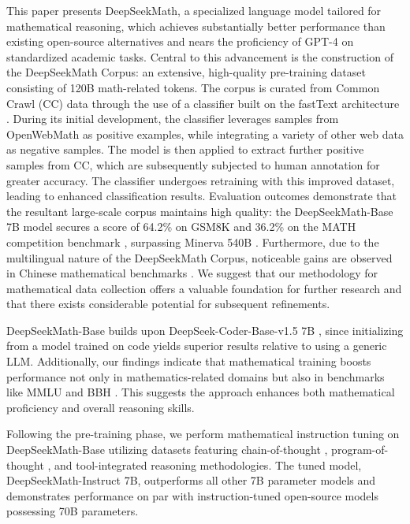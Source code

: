 This paper presents DeepSeekMath, a specialized language model tailored for mathematical reasoning, which achieves substantially better performance than existing open-source alternatives and nears the proficiency of GPT-4 on standardized academic tasks. Central to this advancement is the construction of the DeepSeekMath Corpus: an extensive, high-quality pre-training dataset consisting of 120B math-related tokens. The corpus is curated from Common Crawl (CC) data through the use of a classifier built on the fastText architecture \citep{joulin2016fasttext}. During its initial development, the classifier leverages samples from OpenWebMath \citep{openwebmath} as positive examples, while integrating a variety of other web data as negative samples. The model is then applied to extract further positive samples from CC, which are subsequently subjected to human annotation for greater accuracy. The classifier undergoes retraining with this improved dataset, leading to enhanced classification results. Evaluation outcomes demonstrate that the resultant large-scale corpus maintains high quality: the DeepSeekMath-Base 7B model secures a score of 64.2\% on GSM8K \citep{gsm8k} and 36.2\% on the MATH competition benchmark \citep{MATH}, surpassing Minerva 540B \citep{minerva}. Furthermore, due to the multilingual nature of the DeepSeekMath Corpus, noticeable gains are observed in Chinese mathematical benchmarks \citep{wei2023cmath,agieval}. We suggest that our methodology for mathematical data collection offers a valuable foundation for further research and that there exists considerable potential for subsequent refinements.

DeepSeekMath-Base builds upon DeepSeek-Coder-Base-v1.5 7B \citep{deepseek-coder}, since initializing from a model trained on code yields superior results relative to using a generic LLM. Additionally, our findings indicate that mathematical training boosts performance not only in mathematics-related domains but also in benchmarks like MMLU \citep{mmlu} and BBH \citep{bbh}. This suggests the approach enhances both mathematical proficiency and overall reasoning skills.

Following the pre-training phase, we perform mathematical instruction tuning on DeepSeekMath-Base utilizing datasets featuring chain-of-thought \citep{cot}, program-of-thought \citep{pot,pal}, and tool-integrated reasoning \citep{tora} methodologies. The tuned model, DeepSeekMath-Instruct 7B, outperforms all other 7B parameter models and demonstrates performance on par with instruction-tuned open-source models possessing 70B parameters.

